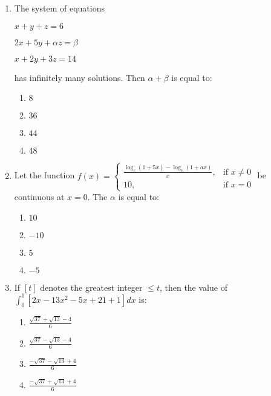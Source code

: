 \documentclass[journal]{IEEEtran}
\newcommand{\brak}[1]{\left( #1 \right)}
\newcommand{\sbrak}[1]{\left[ #1 \right]}
\begin{document}
\begin{enumerate}
    \item The system of equations

        $x + y + z = 6$
        
        $2x + 5y + \alpha z = \beta$
        
        $x + 2y + 3z = 14$
        
        has infinitely many solutions. Then $\alpha + \beta$ is equal to:
 
        \begin{multicols}{4}
        \begin{enumerate}
        \item $8$
        \item $36$
        \item $44$
        \item $48$
        \end{enumerate}
        \end{multicols}

    \item Let the function
        $f\brak{x}=\begin{cases}
        \frac{\log_{e}\brak{1+5x}-\log_{e}\brak{1+ax}}{x}, & \text{if } x\neq0 \\
        10, & \text{if } x=0
        \end{cases}$        
        be continuous at $x=0$. The $\alpha$ is equal to:
        
        \begin{multicols}{4}
        \begin{enumerate}
        \item $10$
        \item $-10$
        \item $5$
        \item $-5$
        \end{enumerate}
        \end{multicols}

    \item If $\sbrak{t}$ denotes the greatest integer $\leq t$, then the value of $\int_{0}^{1}\sbrak{2x-13x^{2}-5x+21+1}dx$ is:

        \begin{multicols}{4}
        \begin{enumerate}
        \item $\frac{\sqrt{37}+\sqrt{13}-4}{6}$
        \item $\frac{\sqrt{37}-\sqrt{13}-4}{6}$
        \item $\frac{-\sqrt{37}-\sqrt{13}+4}{6}$
        \item $\frac{-\sqrt{37}+\sqrt{13}+4}{6}$
        \end{enumerate}
        \end{multicols}


\end{enumerate}
\end{document}
